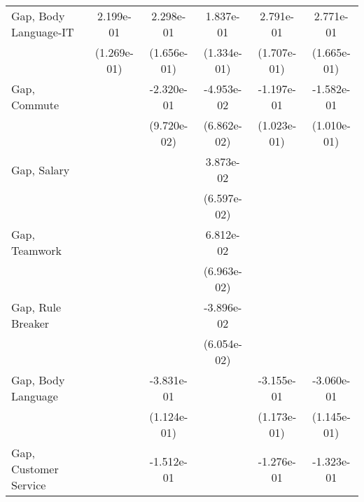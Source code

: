 {\begin{tabular}{l*{5}{c}}
    \addlinespace
    Gap, Body Language-IT     & 2.199e-01\sym{+}      & 2.298e-01             & 1.837e-01             & 2.791e-01             & 2.771e-01\sym{+}            \\
                              & (1.269e-01)           & (1.656e-01)           & (1.334e-01)           & (1.707e-01)           & (1.665e-01)                 \\
    \addlinespace
    Gap, Commute              &                       & -2.320e-01\sym{++}    & -4.953e-02            & -1.197e-01            & -1.582e-01                  \\
                              &                       & (9.720e-02)           & (6.862e-02)           & (1.023e-01)           & (1.010e-01)                 \\
    \addlinespace
    Gap, Salary               &                       &                       & 3.873e-02             &                       &                             \\
                              &                       &                       & (6.597e-02)           &                       &                             \\
    \addlinespace
    Gap, Teamwork             &                       &                       & 6.812e-02             &                       &                             \\
                              &                       &                       & (6.963e-02)           &                       &                             \\
    \addlinespace
    Gap, Rule Breaker         &                       &                       & -3.896e-02            &                       &                             \\
                              &                       &                       & (6.054e-02)           &                       &                             \\
    \addlinespace
    Gap, Body Language        &                       & -3.831e-01\sym{**}    &                       & -3.155e-01\sym{*}     & -3.060e-01\sym{*}           \\
                              &                       & (1.124e-01)           &                       & (1.173e-01)           & (1.145e-01)                 \\
    \addlinespace
    Gap, Customer Service     &                       & -1.512e-01            &                       & -1.276e-01            & -1.323e-01                  \\

\end{tabular}}
